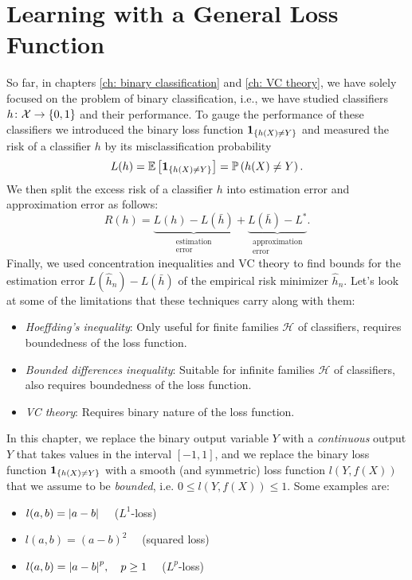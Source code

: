 \chapter{Learning with a General Loss Function}

So far, in chapters \ref{ch: binary classification} and \ref{ch: VC theory}, we have solely focused on the problem of binary classification, i.e., we have studied classifiers $h \colon \mathcal{X} \to \left\{0, 1\right\}$ and their performance. To gauge the performance of these classifiers we introduced the binary loss function $\mathbf{1}_{\left\{h(X) \neq Y\right\}}$ and measured the risk of a classifier $h$ by its misclassification probability
\[
    L(h) = \mathbb{E}\left[\mathbf{1}_{\left\{h(X) \neq Y\right\}}\right] = \mathbb{P}\left(h(X) \neq Y\right).
\]
We then split the excess risk of a classifier $h$ into estimation error and approximation error as follows:
\[
    R(h) = \underbrace{L(h) - L(\bar h)}_{\substack{\text{estimation} \\ \text{error}}} + \underbrace{L(\bar h) - L^*}_{\substack{\text{approximation} \\ \text{error}}}.
\]
Finally, we used concentration inequalities and VC theory to find bounds for the estimation error $L(\hat h_n) - L(\bar h)$ of the empirical risk minimizer $\hat h_n$. Let's look at some of the limitations that these techniques carry along with them:

\begin{itemize}
    \item \emph{Hoeffding's inequality}: Only useful for finite families $\mathcal{H}$ of classifiers, requires boundedness of the loss function.

    \item \emph{Bounded differences inequality}: Suitable for infinite families $\mathcal{H}$ of classifiers, also requires boundedness of the loss function.

    \item \emph{VC theory}: Requires binary nature of the loss function.
\end{itemize}

In this chapter, we replace the binary output variable $Y$ with a \emph{continuous} output $Y$ that takes values in the interval $[-1, 1]$, and we replace the binary loss function $\mathbf{1}_{\left\{h(X) \neq Y\right\}}$ with a smooth (and symmetric) loss function $l(Y, f(X))$ that we assume to be \emph{bounded}, i.e. $0 \leq l(Y, f(X)) \leq 1$. Some examples are:

\begin{itemize}
    \item $l(a, b) = \abs{a - b} \quad$ ($L^1$-loss)
    
    \item $l(a, b) = (a - b)^2 \quad$ (squared loss)

    \item $l(a, b) = \abs{a - b}^p, \quad p \geq 1 \quad$ ($L^p$-loss)
\end{itemize}

